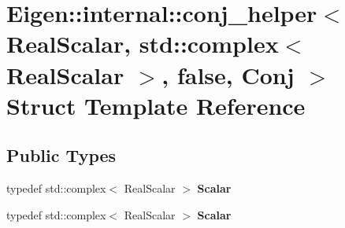 \hypertarget{struct_eigen_1_1internal_1_1conj__helper_3_01_real_scalar_00_01std_1_1complex_3_01_real_scalar_01_4_00_01false_00_01_conj_01_4}{}\section{Eigen\+:\+:internal\+:\+:conj\+\_\+helper$<$ Real\+Scalar, std\+:\+:complex$<$ Real\+Scalar $>$, false, Conj $>$ Struct Template Reference}
\label{struct_eigen_1_1internal_1_1conj__helper_3_01_real_scalar_00_01std_1_1complex_3_01_real_scalar_01_4_00_01false_00_01_conj_01_4}
\subsection*{Public Types}
\begin{DoxyCompactItemize}
\item 
\mbox{\label{struct_eigen_1_1internal_1_1conj__helper_3_01_real_scalar_00_01std_1_1complex_3_01_real_scalar_01_4_00_01false_00_01_conj_01_4_a439125d3e845768d3698076787d179c4}} 
typedef std\+::complex$<$ Real\+Scalar $>$ {\bfseries Scalar}
\item 
\mbox{\label{struct_eigen_1_1internal_1_1conj__helper_3_01_real_scalar_00_01std_1_1complex_3_01_real_scalar_01_4_00_01false_00_01_conj_01_4_a439125d3e845768d3698076787d179c4}} 
typedef std\+::complex$<$ Real\+Scalar $>$ {\bfseries Scalar}
\end{DoxyCompactItemize}
